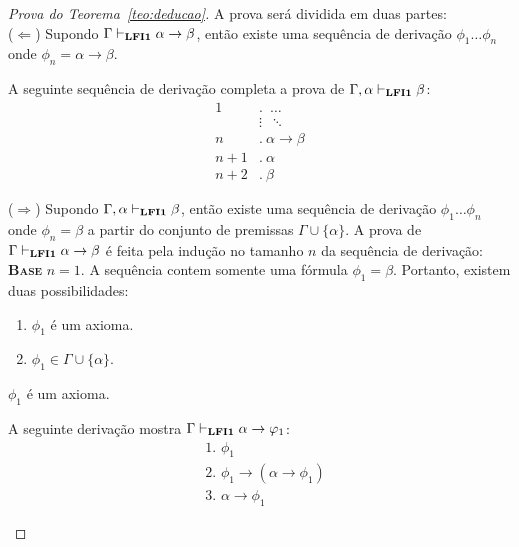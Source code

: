     \begin{proof}[Prova do Teorema~\ref{teo:deducao}] A prova será dividida em duas partes:\\
        ($\Longleftarrow$) Supondo $\Gamma \vdash_{{\normalfont\textbf{LFI1}}{}} \alpha \to \beta$, então existe uma sequência de derivação $\phi_{1} \ldots \phi_{n}$ onde $\phi_{n} = \alpha \to \beta$. 
        
        A seguinte sequência de derivação completa a prova de $\Gamma, \alpha \vdash_{{\normalfont\textbf{LFI1}}{}} \beta$:
        \begin{align*}
            \text{1}&.~ \; \ldots\\
            & \vdots \; ~\ddots\\
            \text{$n$}&.~ \alpha \to \beta\tag{Suposição}\\
            \text{$n + 1$}&.~ \alpha\tag{Premissa}\\
            \text{$n + 2$}&.~ \beta\tag{MP $n, n + 1$}
        \end{align*}

        \noindent  ($\Longrightarrow$) Supondo $\Gamma, \alpha \vdash_{{\normalfont\textbf{LFI1}}{}} \beta$, então existe uma sequência de derivação $\phi_{1} \ldots \phi_{n}$ onde $\phi_{n} = \beta$ a partir do conjunto de premissas $\Gamma \cup \{\alpha\}$. A prova de $\Gamma \vdash_{{\normalfont\textbf{LFI1}}{}} \alpha \to \beta$ é feita pela indução no tamanho $n$ da sequência de derivação:\\

        \noindent \textbf{\textsc{Base}} $n = 1$.
        A sequência contem somente uma fórmula $\phi_{1} = \beta$. Portanto, existem duas possibilidades:
        \begin{enumerate}
            \item $\phi_{1}$ é um axioma.
            \item $\phi_{1} \in \Gamma \cup \{\alpha\}$.
        \end{enumerate}

        \begin{provaporcasos}
            \casodeprova{} $\phi_{1}$ é um axioma. 
            
                A seguinte derivação mostra $\Gamma \vdash_{{\normalfont\textbf{LFI1}}{}} \alpha \to \varphi_{1}$:
                \begin{align*}
                    & \text{1. } \phi_{1} \tag{Axioma}\\
                    & \text{2. } \phi_{1} \to (\alpha \to \phi_{1}) \tag{Ax1}\\
                    & \text{3. } \alpha \to \phi_{1} \tag{MP 1,2}
                \end{align*}


\end{provaporcasos}
\end{proof}
